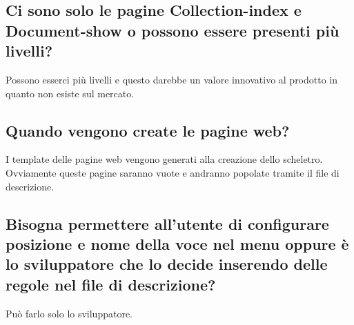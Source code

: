 \subsection{Ci sono solo le pagine Collection-index e Document-show o possono essere presenti più livelli?}
Possono esserci più livelli e questo darebbe un valore innovativo al prodotto in quanto non esiste sul mercato.

\subsection{Quando vengono create le pagine web?}
I template delle pagine web vengono generati alla creazione dello scheletro. Ovviamente queste pagine saranno vuote e andranno popolate tramite il file di descrizione.

\subsection{Bisogna permettere all'utente di configurare posizione e nome della voce nel menu oppure è lo sviluppatore che lo decide inserendo delle regole nel file di descrizione?}
Può farlo solo lo sviluppatore.



